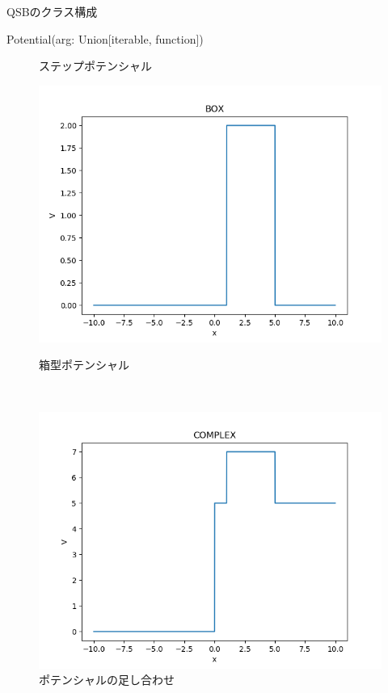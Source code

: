 \documentclass[a4paper, lualatex]{bxjsarticle}
\begin{document}
\begin{section}{QSBのクラス構成\label{AppQ}}
\begin{subsection}{Potential(arg: Union[iterable, function])}
\begin{figure}[h]
\begin{minipage}{0.5\hsize}
                \caption{ステップポテンシャル}
            \end{minipage}
            \begin{minipage}{0.5\hsize}
                \centering
                \includegraphics[width=0.9\hsize]{BOX.png}
                \caption{箱型ポテンシャル}
            \end{minipage}\\
            \begin{minipage}{0.5\hsize}
                \centering
                \includegraphics[width=0.9\hsize]{COMPLEX.png}
                \caption{ポテンシャルの足し合わせ}
            \end{minipage}
            \begin{minipage}{0.5\hsize}
                \centering

\end{minipage}
\end{figure}
\end{subsection}
\end{section}
\end{document}
